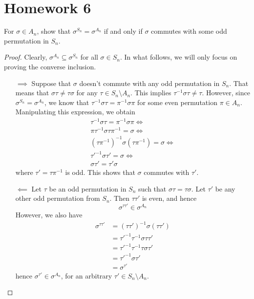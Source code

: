 \section*{Homework 6}

\begin{exercise}
For \(\sigma \in A_n\), show that \(\sigma^{S_n} = \sigma^{A_n}\) if and only if \(\sigma\) commutes with some odd permutation in \(S_n\).
\end{exercise}
\begin{proof}
Clearly, \(\sigma^{A_n} \subseteq \sigma^{S_n}\) for all \(\sigma \in S_n\). In what follows, we will only focus on proving the converse inclusion.

\begin{itemize}
    \item[\(\implies\)] Suppose that \(\sigma\) doesn't commute with any odd permutation in \(S_n\). That means that \(\sigma \tau \neq \tau \sigma\) for any \(\tau \in S_n \setminus A_n\). This implies \(\tau^{-1} \sigma \tau \neq \tau\). However, since \(\sigma^{S_n} = \sigma^{A_n}\), we know that \(\tau^{-1} \sigma \tau = \pi^{-1} \sigma \pi\) for some even permutation \(\pi \in A_n\). Manipulating this expression, we obtain
    \begin{gather*}
        \tau^{-1} \sigma \tau = \pi^{-1} \sigma \pi \iff \\
        \pi \tau^{-1} \sigma \tau \pi^{-1} = \sigma \iff \\
        (\tau \pi^{-1})^{-1} \sigma (\tau \pi^{-1}) = \sigma \iff \\
        \tau'^{-1} \sigma \tau' = \sigma \iff \\
        \sigma \tau' = \tau' \sigma
    \end{gather*}
    where \(\tau' = \tau \pi^{-1}\) is odd. This shows that \(\sigma\) commutes with \(\tau'\).
    
    \item[\(\impliedby\)] Let \(\tau\) be an odd permutation in \(S_n\) such that \(\sigma \tau = \tau \sigma\). Let \(\tau'\) be any other odd permutation from \(S_n\). Then \(\tau \tau'\) is even, and hence
    \[
        \sigma^{\tau \tau'} \in \sigma^{A_n}
    \]
    However, we also have
    \begin{align*}
       \sigma^{\tau \tau'} &= (\tau \tau')^{-1} \sigma (\tau \tau') \\
       &= \tau'^{-1} \tau^{-1} \sigma \tau \tau' \\
       &= \tau'^{-1} \tau^{-1} \tau \sigma \tau' \\
       &= \tau'^{-1} \sigma \tau' \\
       &= \sigma^{\tau'}
    \end{align*}
    hence \(\sigma^{\tau'} \in \sigma^{A_n}\), for an arbitrary \(\tau' \in S_n \setminus A_n\).
\end{itemize}
\end{proof}

